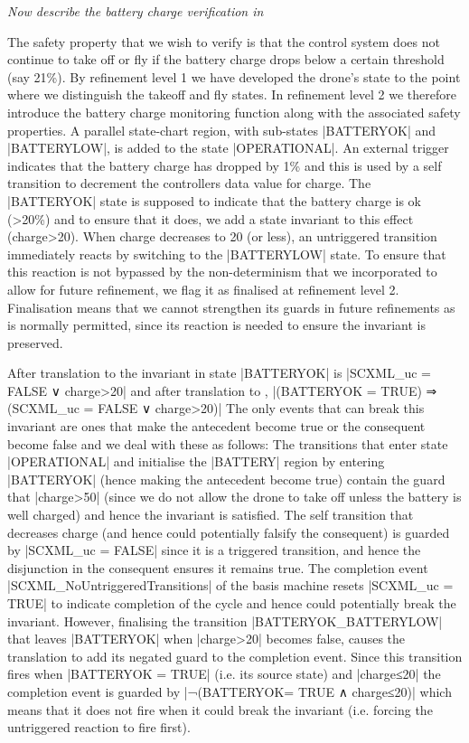 \emph{Now describe the battery charge verification in \UMLB}

The safety property that we wish to verify is that the control system does not continue to take off or fly if the battery charge drops below a certain threshold (say 21\%). 
By refinement level 1 we have developed the drone's state to the point where we distinguish the takeoff and fly states.
In refinement level 2 we therefore introduce the battery charge monitoring function along with the associated safety properties.
A parallel state-chart region, with sub-states |BATTERYOK| and |BATTERYLOW|, is added to the state |OPERATIONAL|.
An external trigger indicates that the battery charge has dropped by 1\% and this is used by a self transition to decrement the controllers data value for charge.
The |BATTERYOK| state is supposed to indicate that the battery charge is ok (>20\%) and to ensure that it does, we add a state invariant to this effect (charge>20).
When charge decreases to 20 (or less), an untriggered transition immediately reacts by switching to the |BATTERYLOW| state.
To ensure that this reaction is not bypassed by the non-determinism that we incorporated to allow for future refinement, we flag it as finalised at refinement level 2.
Finalisation means that we cannot strengthen its guards in future refinements as is normally permitted, since its reaction is needed to ensure the invariant is preserved.

After translation to \UMLB the invariant in state |BATTERYOK| is 
\newline |SCXML_uc = FALSE ∨ charge>20| and after translation to \EVENTB, 
\newline |(BATTERYOK = TRUE) ⇒ (SCXML_uc = FALSE ∨ charge>20)|
The only events that can break this invariant are ones that make the antecedent become true or the consequent become false and we deal with these as follows:
The transitions that enter state |OPERATIONAL| and initialise the |BATTERY| region by entering |BATTERYOK| (hence making the antecedent become true) contain the guard that |charge>50| (since we do not allow the drone to take off unless the battery is well charged) and hence the invariant is satisfied.
The self transition that decreases charge (and hence could potentially falsify the consequent) is guarded by |SCXML_uc = FALSE| since it is a triggered transition, and hence the disjunction in the consequent ensures it remains true.
The completion event |SCXML_NoUntriggeredTransitions| of the basis machine resets |SCXML_uc = TRUE| to indicate completion of the cycle and hence could potentially break the invariant. 
However, finalising the transition |BATTERYOK_BATTERYLOW| that leaves |BATTERYOK| when |charge>20| becomes false, causes the translation to add its negated guard to the completion event.
Since this transition fires when |BATTERYOK = TRUE| (i.e. its source state) and |charge≤20| the completion event is guarded by |¬(BATTERYOK= TRUE ∧ charge≤20)| which means that it does not fire when it could break the invariant (i.e. forcing the untriggered reaction to fire first).

